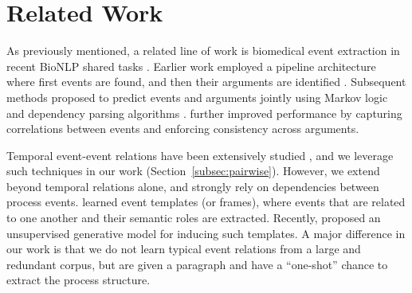 \section{Related Work}
As  previously mentioned, a related line of work is biomedical event extraction in recent BioNLP shared tasks \cite{kim09,kim11}. 
Earlier work employed a pipeline architecture where first events are found, and then their arguments are identified \cite{Miwa10,Bjorne11}. Subsequent methods proposed to predict events and arguments jointly using Markov logic \cite{Poon10} and dependency parsing algorithms \cite{Mcclosky11}.  further improved performance by capturing correlations between events and enforcing consistency across arguments.



Temporal event-event relations have been extensively studied \cite{Chambers08,Yoshikawa09,Denis11,Do12,Mcclosky12,DSouzaNg:13a}, and we leverage such techniques in our work (Section~\ref{subsec:pairwise}). However, we extend beyond temporal relations alone, and strongly rely on dependencies between process events.  learned event templates (or frames), where events that are related to one another and their semantic roles are extracted. Recently,  proposed an unsupervised generative model for inducing such templates. A major difference in our work is that we do not learn typical event relations from a large and redundant corpus, but are given a paragraph and have a ``one-shot'' chance to extract the process structure.

